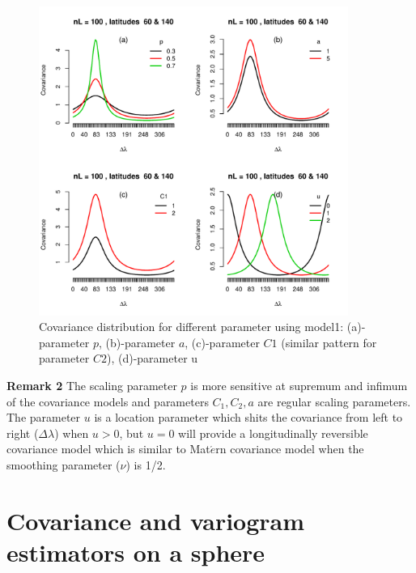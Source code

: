 			\begin{figure}[H]
				\centering
				\includegraphics[width=0.9\textwidth]{graphs/parameters_model1_2}
				\caption[Covariance distribution for different parameters using model1:] {Covariance distribution for different parameter using model1:  (a)-parameter $p$, (b)-parameter $a$, (c)-parameter $C1$ (similar pattern for parameter $C2$), (d)-parameter u}
				\label{fig_parameter_comp}
			\end{figure}
			
			{\bf Remark 2} The scaling parameter $p$ is more sensitive at supremum and infimum of the covariance models and parameters $C_1, C_2, a$ are regular scaling parameters. The parameter $u$ is a location parameter which shits the covariance from left to right ($\Delta\lambda$) when $u>0$, but $u=0$ will provide a longitudinally reversible covariance model which is similar to Mat$\acute{e}$rn covariance model when the smoothing parameter ($\nu$) is 1/2.  \\     
			
			
			\section{Covariance and variogram estimators on a sphere}
				
